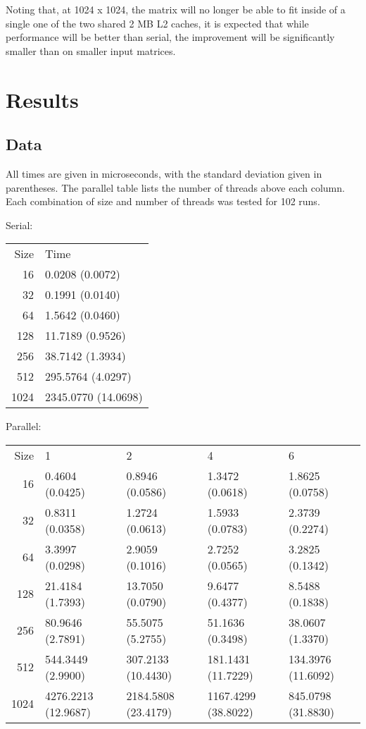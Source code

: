 \documentclass{article}
\begin{document}
Noting that, at 1024 x 1024, the matrix will no longer be able to fit
inside of a single one of the two shared 2 MB L2 caches, it is
expected that while performance will be better than serial, the
improvement will be significantly smaller than on smaller input
matrices. 

\section{Results}
\subsection{Data}
All times are given in microseconds, with the standard deviation given
in parentheses. The parallel table lists the number of threads above
each column. Each combination of size and number of threads was tested
for 102 runs.

Serial:
\begin{center}
\begin{tabular}{rl}
 Size  &  Time                 \\
   16  &  0.0208 (0.0072)      \\
   32  &  0.1991 (0.0140)      \\
   64  &  1.5642 (0.0460)      \\
  128  &  11.7189 (0.9526)     \\
  256  &  38.7142 (1.3934)     \\
  512  &  295.5764 (4.0297)    \\
 1024  &  2345.0770 (14.0698)  \\
\end{tabular}
\end{center}


Parallel: 
\begin{center}
\begin{tabular}{rllll}
 Size  &  1                    &  2                    &  4                    &  6                   \\
   16  &  0.4604 (0.0425)      &  0.8946 (0.0586)      &  1.3472 (0.0618)      &  1.8625 (0.0758)     \\
   32  &  0.8311 (0.0358)      &  1.2724 (0.0613)      &  1.5933 (0.0783)      &  2.3739 (0.2274)     \\
   64  &  3.3997 (0.0298)      &  2.9059 (0.1016)      &  2.7252 (0.0565)      &  3.2825 (0.1342)     \\
  128  &  21.4184 (1.7393)     &  13.7050 (0.0790)     &  9.6477 (0.4377)      &  8.5488 (0.1838)     \\
  256  &  80.9646 (2.7891)     &  55.5075 (5.2755)     &  51.1636 (0.3498)     &  38.0607 (1.3370)    \\
  512  &  544.3449 (2.9900)    &  307.2133 (10.4430)   &  181.1431 (11.7229)   &  134.3976 (11.6092)  \\
 1024  &  4276.2213 (12.9687)  &  2184.5808 (23.4179)  &  1167.4299 (38.8022)  &  845.0798 (31.8830)  \\
\end{tabular}
\end{center}
\end{document}
